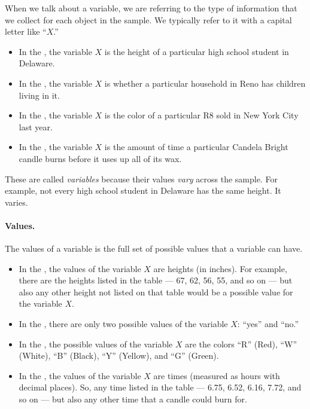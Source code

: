 \documentclass[../../../main.tex]{subfiles}
\begin{document}
When we talk about a variable, we are referring to the type of information that we collect for each object in the sample. We typically refer to it with a capital letter like ``$X$.''

\begin{itemize}

  \item In the , the variable $X$ is the height of a particular high school student in Delaware.
    
  \item In the , the variable $X$ is whether a particular household in Reno has children living in it.
    
  \item In the , the variable $X$ is the color of a particular R8 sold in New York City last year.
  
  \item In the , the variable $X$ is the amount of time a particular Candela Bright candle burns before it uses up all of its wax.

\end{itemize}

These are called \emph{variables} because their values \emph{vary} across the sample. For example, not every high school student in Delaware has the same height. It varies.


\paragraph{Values.}

The values of a variable is the full set of possible values that a variable can have.

\begin{itemize}

  \item In the , the values of the variable $X$ are heights (in inches). For example, there are the heights listed in the table --- 67, 62, 56, 55, and so on --- but also any other height not listed on that table would be a possible value for the variable $X$.
    
  \item In the , there are only two possible values of the variable $X$: ``yes'' and ``no.''
    
  \item In the , the possible values of the variable $X$ are the colors ``R'' (Red), ``W'' (White), ``B'' (Black), ``Y'' (Yellow), and ``G'' (Green).
  
  \item In the , the values of the variable $X$ are times (measured as hours with decimal places). So, any time listed in the table --- 6.75, 6.52, 6.16, 7.72, and so on --- but also any other time that a candle could burn for.

\end{itemize}
\end{document}
